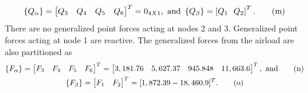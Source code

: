 \documentclass{AeroStructure-ERJohnson}
\begin{document}
\begin{example}
\begin{equation}
\left\{Q_{\alpha}\right\}=\left[\begin{array}{@{}llll@{}} Q_{3} & Q_{4} & Q_{5} & Q_{6}\end{array}\right]^{T}=0_{4 X 1}, \textrm{ and } \left\{Q_{\beta}\right\}=\left[Q_{1}\ \ Q_{2}\right]^{T}. \label{eq17.5.m}\tag{m}
\end{equation}
There are no generalized point forces acting at nodes 2 and 3. Generalized point forces acting at node 1 are reactive. The generalized forces from the airload are also partitioned as
\begin{gather}
\left\{F_{\alpha}\right\}=\left[\begin{array}{@{}llll@{}}F_{3} & F_{4} & F_{5} & F_{6}\end{array}\right]^{T}=\left[\begin{array}{@{}llll@{}}3,181.76 & 5,627.37 & 945.848 & 11,663.6\end{array}\right]^{T}, \textrm{ and}\label{eq17.5.n}\tag{n}\\
\left\{F_{\beta}\right\}=\left[\begin{array}{@{}ll@{}}F_{1} & F_{2}\end{array}\right]^{T}=[1,872.39-18,460.9]^{T}. \label{eq17.5.o}\tag{o}
\end{gather}

\vspace*{-1pc}


\end{example}
\end{document}
